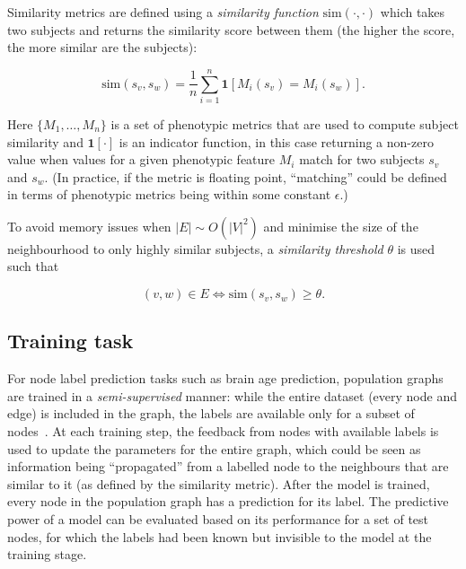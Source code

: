 Similarity metrics are defined using a \textit{similarity function} $\mathrm{sim}(\cdot, \cdot)$ which takes two subjects and returns the similarity score between them (the higher the score, the more similar are the subjects):

\begin{equation}
    \mathrm{sim}(s_v, s_w) = \frac{1}{n}\sum_{i=1}^{n} \mathbf{1}[M_i(s_v) = M_i(s_w)].
\end{equation}

Here $\{M_1, \dots, M_n\}$ is a set of phenotypic metrics that are used to compute subject similarity and $\mathbf{1}[\cdot]$ is an indicator function, in this case returning a non-zero value when values for a given phenotypic feature $M_i$ match for two subjects $s_v$ and $s_w$. (In practice, if the metric is floating point, ``matching'' could be defined in terms of phenotypic metrics being within some constant $\epsilon$.) 

To avoid memory issues when $|E| \sim O(|V|^2)$ and minimise the size of the neighbourhood to only highly similar subjects, a \textit{similarity threshold} $\theta$ is used such that

\begin{equation}
    (v, w) \in E \iff \mathrm{sim}(s_v, s_w) \geq \theta.
\end{equation}

\subsection{Training task}


For node label prediction tasks such as brain age prediction, population graphs are trained in a \textit{semi-supervised} manner: while the entire dataset (every node and edge) is included in the graph, the labels are available only for a subset of nodes~\cite{kipf2017semi}. At each training step, the feedback from nodes with available labels is used to update the parameters for the entire graph, which could be seen as information being ``propagated'' from a labelled node to the neighbours that are similar to it (as defined by the similarity metric). After the model is trained, every node in the population graph has a prediction for its label. The predictive power of a model can be evaluated based on its performance for a set of test nodes, for which the labels had been known but invisible to the model at the training stage.


